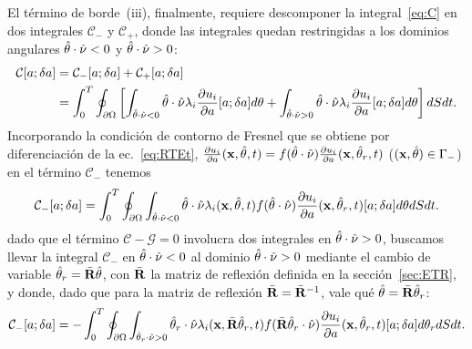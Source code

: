 El término de borde~(iii), finalmente, requiere 
descomponer la integral~\eqref{eq:C} en dos integrales
$\mathcal{C}_-$ y $\mathcal{C}_+$, 
donde las integrales quedan restringidas a los dominios 
angulares  $\hat{\theta}\cdot \hat{\nu}<0$ y $\hat{\theta}\cdot \hat{\nu} >0$:
\begin{equation}
\begin{split}
\begin{aligned}
  \displaystyle \mathcal{C}[a;\delta a]&=\mathcal{C}_-[a;\delta a] + \mathcal{C}_+[a;\delta a]
  \\&=\int_0^T
  \oint_{\partial \Omega} \left[ \int_{\hat{\theta} \cdot \hat{\nu}<0} \hat{\theta}\cdot \hat{\nu} \lambda_i
  \frac{\partial u_i}{\partial a}[a;\delta a] d\theta + \int_{\hat{\theta} \cdot \hat{\nu}>0} \hat{\theta}\cdot \hat{\nu} \lambda_i
  \frac{\partial u_i}{\partial a}[a;\delta a] d\theta  \right] dS dt.
\end{aligned}
\end{split}
\label{eq:C2}
\end{equation}
Incorporando la condición de contorno de Fresnel que se obtiene 
por diferenciación de la ec.~\eqref{eq:RTEt}, 
$\frac{\partial u_i}{\partial a}(\mathbf{x},\hat{\theta},t)=f(\hat{\theta} \cdot \hat{\nu})
\frac{\partial u_i}{\partial a}(\mathbf{x},\hat{\theta}_r,t)$ ($(\mathbf{x},\hat{\theta}) \in \Gamma_-$)  en el término $\mathcal{C}_-$ 
tenemos 
\begin{equation}
\begin{split}
\begin{aligned}
  \displaystyle\mathcal{C}_-[a;\delta a]=\int_0^T
  \oint_{\partial \Omega} \int_{\hat{\theta} \cdot \hat{\nu}<0} \hat{\theta}\cdot \hat{\nu} \lambda_i(\mathbf{x},\hat{\theta},t)
  f(\hat{\theta} \cdot \hat{\nu}) \frac{\partial u_i}{\partial a}(\mathbf{x},\hat{\theta}_r,t)[a;\delta a] d\theta  dS dt.
\end{aligned}
\end{split}
\label{eq:C2m}
\end{equation}
dado que el término $\mathcal{C}-\mathcal{G}=0$ involucra dos integrales 
en $\hat{\theta}\cdot \hat{\nu} >0$, buscamos llevar la integral $\mathcal{C}_-$ en $\hat{\theta}\cdot \hat{\nu} <0$
al dominio $\hat{\theta}\cdot \hat{\nu}>0$ mediante el cambio de variable $\hat{\theta}_r=\bar{\mathbf{R}} \hat{\theta}$, 
con $\bar{\mathbf{R}}$ la matriz de reflexión definida en la sección~\ref{sec:ETR}, y 
donde, dado que para la matriz de reflexión $\bar{\mathbf{R}}=\bar{\mathbf{R}}^{-1}$, vale qué $\hat{\theta}=\bar{\mathbf{R}}\hat{\theta}_r$:
\begin{equation}
\begin{split}
\begin{aligned}
  \displaystyle\mathcal{C}_-[a;\delta a]=-\int_0^T
  \oint_{\partial \Omega} \int_{\hat{\theta}_r \cdot \hat{\nu}>0} \hat{\theta}_r \cdot \hat{\nu} \lambda_i(\mathbf{x},\bar{\mathbf{R}} \hat{\theta}_r,t)
  f(\bar{\mathbf{R}} \hat{\theta}_r \cdot \hat{\nu}) \frac{\partial u_i}{\partial a}(\mathbf{x},\hat{\theta}_r,t)[a;\delta a] d\theta_r  dS dt.
\end{aligned}
\end{split}
\label{eq:C2m2}
\end{equation}

